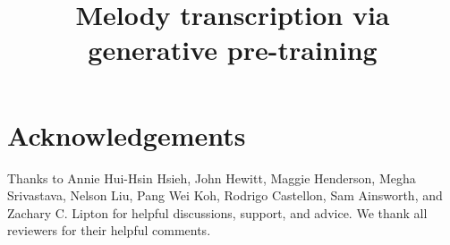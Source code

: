 \documentclass{article}
\title{Melody transcription via generative pre-training}
\begin{document}
\maketitle

\begin{abstract}

\end{abstract}



















\section{Acknowledgements}

Thanks to 
Annie Hui-Hsin Hsieh, %
John Hewitt, %
Maggie Henderson, %
Megha Srivastava, %
Nelson Liu, %
Pang Wei Koh, %
Rodrigo Castellon, %
Sam Ainsworth, %
and
Zachary C. Lipton %
for helpful discussions, support, and advice. 
We thank all reviewers for their helpful comments.


\end{document}
